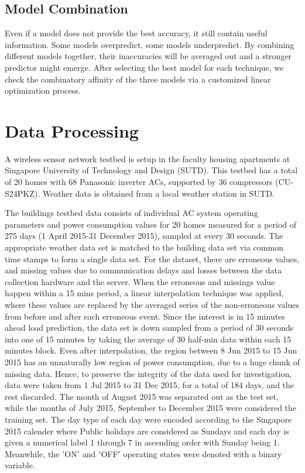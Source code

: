 \documentclass[conference]{IEEEtran}
\begin{document}
\subsection{Model Combination}
 Even if a model does not provide the best accuracy, it still contain useful information. Some models overpredict, some models underpredict. By combining different models together, their inaccuracies will be averaged out and a stronger predictor might emerge\cite{dvzeroski2004}. After selecting the best model for each technique, we check the combinatory affinity of the three models via a customized linear optimization process. 
 
 \section{Data Processing} \label{dataproc}
 A wireless sensor network testbed is setup in the faculty housing apartments at Singapore University of Technology and Design (SUTD). This testbed  has a total of 20 homes with 68 Panasonic inverter ACs, supported by 36 compressors (CU-S24PKZ). Weather data is obtained from a local weather station in SUTD.

The buildings testbed data consists of individual AC system operating parameters and power consumption values for 20 homes measured for a period of 275 days (1 April 2015-31 December 2015), sampled at every 30 seconds. The appropriate weather data set is matched to the building data set via common time stamps to form a single data set. For the dataset, there are erroneous values, and missing values due to communication delays and losses between the data collection hardware and the server. When the erroneous and missings value happen within a 15 mins period, a linear interpolation technique was applied, where these values are replaced by the averaged series of the non-erroneous values from before and after each erroneous event. Since the interest is in 15 minutes ahead load prediction, the data set is down sampled from a period of 30 seconds into one of 15 minutes by taking the average of 30 half-min data within each 15 minutes block. Even after interpolation, the region between 8 Jun 2015 to 15 Jun 2015 has an unnaturally low region of power consumption, due to a huge chunk of missing data. Hence, to preserve the integrity of the data used for investigation, data were taken from 1 Jul 2015 to 31 Dec 2015, for a total of 184 days, and the rest discarded. The month of August 2015 was separated out as the test set, while the months of July 2015, September to December 2015 were considered the training set. The day type of each day were encoded according to the Singapore 2015 calender where Public holidays are considered as Sundays and each day is given a numerical label 1 through 7 in ascending order with Sunday being 1. Meanwhile, the $'$ON$'$ and $'$OFF$'$ operating states were denoted with a binary variable.
\end{document}
